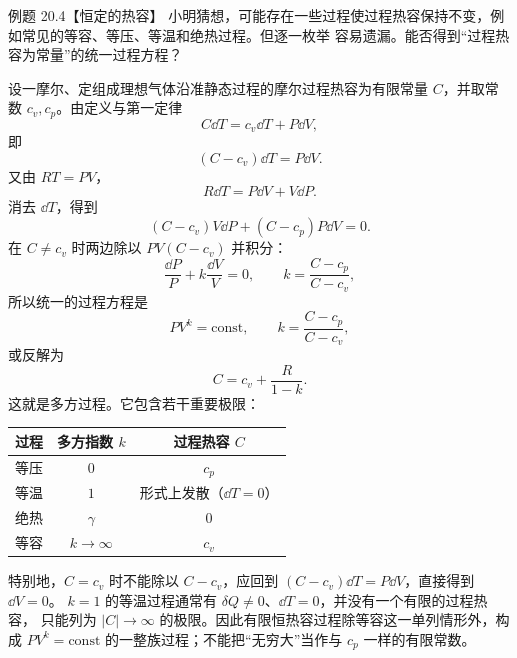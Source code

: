 \begin{origexamplebox}{例题 20.4【恒定的热容】}
小明猜想，可能存在一些过程使过程热容保持不变，例如常见的等容、等压、等温和绝热过程。但逐一枚举
容易遗漏。能否得到“过程热容为常量”的统一过程方程？
\end{origexamplebox}

\begin{xesolution}
设一摩尔、定组成理想气体沿准静态过程的摩尔过程热容为有限常量 $C$，并取常数 $c_v,c_p$。由定义与第一定律
\begin{equation*}
  C\dd T=c_v\dd T+P\dd V,
\end{equation*}
即
\begin{equation*}
  (C-c_v)\dd T=P\dd V.
\end{equation*}
又由 $RT=PV$，
\begin{equation*}
  R\dd T=P\dd V+V\dd P.
\end{equation*}
消去 $\dd T$，得到
\begin{equation*}
  (C-c_v)V\dd P+(C-c_p)P\dd V=0.
\end{equation*}
在 $C\ne c_v$ 时两边除以 $PV(C-c_v)$ 并积分：
\begin{equation*}
  \frac{\dd P}{P}+k\frac{\dd V}{V}=0,
  \qquad
  k=\frac{C-c_p}{C-c_v},
\end{equation*}
所以统一的过程方程是
\begin{equation}
  \boxed{PV^k=\mathrm{const}},
  \qquad
  \boxed{k=\frac{C-c_p}{C-c_v}},
\end{equation}
或反解为
\begin{equation}
  \boxed{C=c_v+\frac{R}{1-k}}.
\end{equation}
这就是多方过程。它包含若干重要极限：
\begin{center}
\small
\begin{tabular}{c c c}
\toprule
过程 & 多方指数 $k$ & 过程热容 $C$\\
\midrule
等压 & $0$ & $c_p$\\
等温 & $1$ & 形式上发散（$\dd T=0$）\\
绝热 & $\gamma$ & $0$\\
等容 & $k\to\infty$ & $c_v$\\
\bottomrule
\end{tabular}
\end{center}
特别地，$C=c_v$ 时不能除以 $C-c_v$，应回到 $(C-c_v)\dd T=P\dd V$，直接得到 $\dd V=0$。
$k=1$ 的等温过程通常有 $\delta Q\ne0$、$\dd T=0$，并没有一个有限的过程热容，
只能列为 $|C|\to\infty$ 的极限。因此有限恒热容过程除等容这一单列情形外，构成
$PV^k=\mathrm{const}$ 的一整族过程；不能把“无穷大”当作与 $c_p$ 一样的有限常数。
\end{xesolution}

